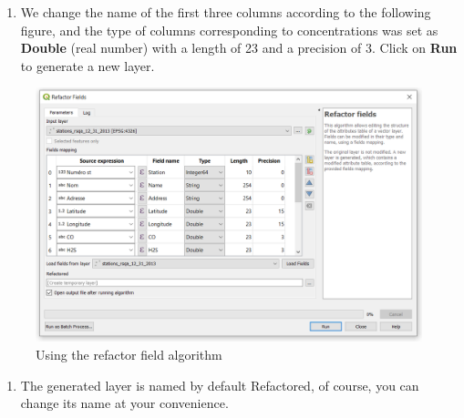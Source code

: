 \documentclass[]{book}
\providecommand{\tightlist}{%
  \setlength{\itemsep}{0pt}\setlength{\parskip}{0pt}}
\theoremstyle{definition}
\theoremstyle{definition}
\theoremstyle{definition}
\theoremstyle{remark}
\begin{document}
\begin{enumerate}
\def\labelenumi{\arabic{enumi}.}
\setcounter{enumi}{2}
\tightlist
\item
  We change the name of the first three columns according to the
  following figure, and the type of columns corresponding to
  concentrations was set as \textbf{Double} (real number) with a length
  of 23 and a precision of 3. Click on \textbf{Run} to generate a new
  layer.
\end{enumerate}

\begin{figure}

{\centering \includegraphics[width=15.32in]{figures/Refactor_Dialog_Settings} 

}

\caption{Using the refactor field algorithm}\label{fig:unnamed-chunk-17}
\end{figure}

\begin{enumerate}
\def\labelenumi{\arabic{enumi}.}
\setcounter{enumi}{3}
\tightlist
\item
  The generated layer is named by default Refactored, of course, you can
  change its name at your convenience.
\end{enumerate}
\end{document}
